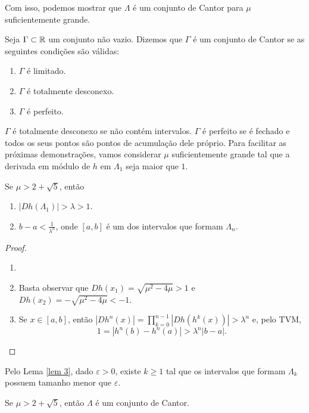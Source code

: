 Com isso, podemos mostrar que $\Lambda$ é um conjunto de Cantor para $\mu$ suficientemente grande.

\begin{definition}
Seja $\Gamma \subset \mathbb{R}$ um conjunto não vazio. Dizemos que $\Gamma$ é um conjunto de Cantor se as seguintes condições são válidas:
\begin{enumerate}[label=\roman*.]
\item $\Gamma$ é limitado.
\item $\Gamma$ é totalmente desconexo.
\item $\Gamma$ é perfeito.
\end{enumerate}
\end{definition}

$\Gamma$ é totalmente desconexo se não contém intervalos. $\Gamma$ é perfeito se é fechado e todos os seus pontos são pontos de acumulação dele próprio. Para facilitar as próximas demonstrações, vamos considerar $\mu$ suficientemente grande tal que a derivada em módulo de $h$ em $\Lambda_1$ seja maior que $1$.

\begin{lemma}\label{lem 3}
Se $\mu > 2 + \sqrt{5}$, então
\begin{enumerate}
\item  $|D h(\Lambda_1)| > \lambda > 1$.
\item $b - a < \frac{1}{\lambda^n}$, onde $[a, b]$ é um dos intervalos que formam $\Lambda_n$.
\end{enumerate}
\end{lemma}

\begin{proof}
\begin{enumerate}\item[]
\item Basta observar que $D h(x_1) = \sqrt{\mu^2 - 4\mu} > 1$ e $D h(x_2) = -\sqrt{\mu^2 - 4\mu} < -1$.
\item Se $x \in [a, b]$, então $|D h^n(x)| = \prod_{k=0}^{n-1} |D h(h^k(x))| > \lambda^n$ e, pelo TVM,
$$1 = |h^n(b) - h^n(a)| > \lambda^n|b - a|.$$
\end{enumerate}
\end{proof} 

Pelo Lema \ref{lem 3}, dado $\varepsilon > 0$, existe $k \geq 1$ tal que os intervalos que formam $\Lambda_k$ possuem tamanho menor que $\varepsilon$. 

\begin{theorem}\label{teo 3-1}
Se $\mu > 2 + \sqrt{5}$, então $\Lambda$ é um conjunto de Cantor.
\end{theorem}

